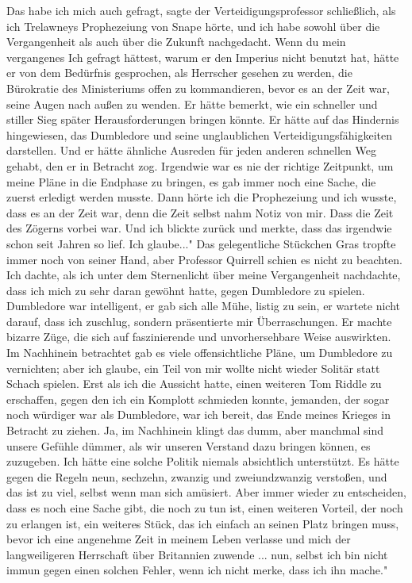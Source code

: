 \glqq Das habe ich mich auch gefragt\grqq{}, sagte der Verteidigungsprofessor
schließlich, \glqq als ich Trelawneys Prophezeiung von Snape hörte, und ich habe
sowohl über die Vergangenheit als auch über die Zukunft nachgedacht. Wenn du
mein vergangenes Ich gefragt hättest, warum er den Imperius nicht benutzt hat,
hätte er von dem Bedürfnis gesprochen, als Herrscher gesehen zu werden, die
Bürokratie des Ministeriums offen zu kommandieren, bevor es an der Zeit war,
seine Augen nach außen zu wenden. Er hätte bemerkt, wie ein schneller und
stiller Sieg später Herausforderungen bringen könnte. Er hätte auf das Hindernis
hingewiesen, das Dumbledore und seine unglaublichen Verteidigungsfähigkeiten
darstellen. Und er hätte ähnliche Ausreden für jeden anderen schnellen Weg
gehabt, den er in Betracht zog. Irgendwie war es nie der richtige Zeitpunkt, um
meine Pläne in die Endphase zu bringen, es gab immer noch eine Sache, die zuerst
erledigt werden musste. Dann hörte ich die Prophezeiung und ich wusste, dass es
an der Zeit war, denn die Zeit selbst nahm Notiz von mir. Dass die Zeit des
Zögerns vorbei war. Und ich blickte zurück und merkte, dass das irgendwie schon
seit Jahren so lief. Ich glaube..." Das gelegentliche Stückchen Gras tropfte
immer noch von seiner Hand, aber Professor Quirrell schien es nicht zu beachten.
\glqq Ich dachte, als ich unter dem Sternenlicht über meine Vergangenheit
nachdachte, dass ich mich zu sehr daran gewöhnt hatte, gegen Dumbledore zu
spielen. Dumbledore war intelligent, er gab sich alle Mühe, listig zu sein, er
wartete nicht darauf, dass ich zuschlug, sondern präsentierte mir
Überraschungen. Er machte bizarre Züge, die sich auf faszinierende und
unvorhersehbare Weise auswirkten. Im Nachhinein betrachtet gab es viele
offensichtliche Pläne, um Dumbledore zu vernichten; aber ich glaube, ein Teil
von mir wollte nicht wieder Solitär statt Schach spielen. Erst als ich die
Aussicht hatte, einen weiteren Tom Riddle zu erschaffen, gegen den ich ein
Komplott schmieden konnte, jemanden, der sogar noch würdiger war als Dumbledore,
war ich bereit, das Ende meines Krieges in Betracht zu ziehen. Ja, im Nachhinein
klingt das dumm, aber manchmal sind unsere Gefühle dümmer, als wir unseren
Verstand dazu bringen können, es zuzugeben. Ich hätte eine solche Politik
niemals absichtlich unterstützt. Es hätte gegen die Regeln neun, sechzehn,
zwanzig und zweiundzwanzig verstoßen, und das ist zu viel, selbst wenn man sich
amüsiert. Aber immer wieder zu entscheiden, dass es noch eine Sache gibt, die
noch zu tun ist, einen weiteren Vorteil, der noch zu erlangen ist, ein weiteres
Stück, das ich einfach an seinen Platz bringen muss, bevor ich eine angenehme
Zeit in meinem Leben verlasse und mich der langweiligeren Herrschaft über
Britannien zuwende ... nun, selbst ich bin nicht immun gegen einen solchen
Fehler, wenn ich nicht merke, dass ich ihn mache."

